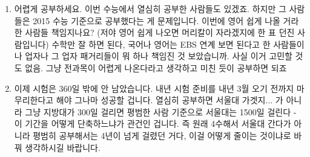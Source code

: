 \begin{enumerate}
    \item 어렵게 공부하세요. 이번 수능에서 열심히 공부한 사람들도 있겠죠. 하지만 그 사람들은 2015 수능 기준으로 공부했다는 게 문제입니다.
    이번에 영어 쉽게 나올 거라 한 사람들 책임지나요? (저야 영어 쉽게 나오면 머리칼이 자라겠지에 한 표 던진 사람입니다)
    수학만 잘 하면 된다, 국어나 영어는 EBS 연계 보면 된다고 한 사람들이나 업자나 그 업자 패거리들이 뭐 하나 책임진 것 보았습니까.
    사실 이거 고민할 것도 없음. 그냥 전과목이 어렵게 나온다라고 생각하고 미친 듯이 공부하면 되죠
    \vspace{5mm}
    
    \item 이제 시험은 360일 밖에 안 남았습니다.
    내년 시험 준비를 내년 3월 오기 전까지 마무리한다고 해야 그나마 성공할 겁니다.
    열심히 공부하면 서울대 가겟지... 가 아니라
    그냥 지방대가 300일 걸리면 평범한 사람 기준으로 서울대는 1500일 걸린다 - 이 기간을 어떻게 단축하느냐가 관건인 겁니다.
    즉 원래 4수해서 서울대 간다가 아니라 평범히 공부해서는 4년이 넘게 걸렸던 거다, 이걸 어떻게 줄이는 것이냐로 바꿔 생각하시길 바랍니다.
    \vspace{5mm}
\end{enumerate}
    
    
    
    
    
